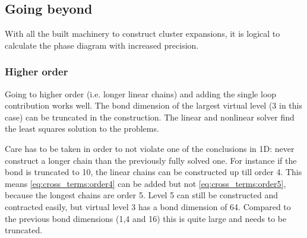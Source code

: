 \subsection{Going beyond}
With all the built machinery to construct cluster expansions, it is logical to calculate the phase diagram with increased precision.

\subsubsection{Higher order}

Going to higher order (i.e. longer linear chains) and adding the single loop contribution works well. The bond dimension of the largest virtual level (3 in this case) can be truncated in the construction. The linear and nonlinear solver find the least squares solution to the problems.

Care has to be taken in order to not violate one of the conclusions in 1D: never construct a longer chain than the previously fully solved one. For instance if the bond is truncated to 10, the linear chains can be constructed up till order 4. This means \cref{eq:cross_terms:order4} can be added but not \cref{eq:cross_terms:order5}, because the longest chains are order 5. Level 5 can still be constructed and contracted easily, but virtual level 3 has a bond dimension of 64. Compared to the previous bond dimensions (1,4 and 16) this is quite large and needs to be truncated.

